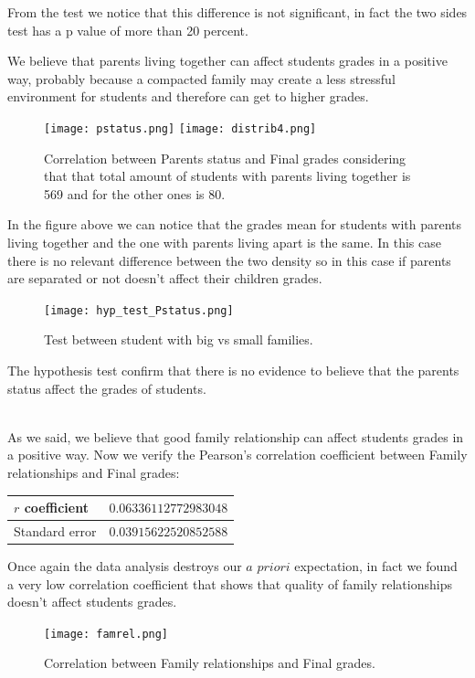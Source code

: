 \documentclass[a4paper, 11pt]{article}
\theoremstyle{definition}
\numberwithin{equation}{section}		%
\numberwithin{table}{section}				%
\begin{document}
\begin{itemize}
From the test we notice that this difference is not significant, in fact
the two sides test has a p value of more than 20 percent.

We believe that parents living together can affect students grades in a positive way, probably because a compacted family may create a less stressful environment for students and therefore can get to higher grades.
\begin{figure}[h]\centering
\texttt{[image: pstatus.png]}\quad
\texttt{[image: distrib4.png]}
\caption{Correlation between Parents status and Final grades considering that that total amount of students with parents living together is 569 and for the other ones is 80.}
\end{figure}

In the figure above we can notice that the grades mean for students with parents living together and the one with parents living apart is the same. In this case there is no relevant difference between the two density so in this case if parents are separated or not doesn't affect their children grades.

\begin{figure}[h]\centering
\texttt{[image: hyp\_test\_Pstatus.png]}
\caption{Test between student with big vs  small families.}
\end{figure}

The hypothesis test confirm that there is no evidence to believe that the 
parents status affect the grades of students.

\\As we said, we believe that good family relationship can affect students grades in a positive way.
Now we verify the Pearson's correlation coefficient between Family relationships and Final grades:
\begin{center}
\begin{tabular}{|p{3cm}|p{4cm}|}
\hline
$r$ coefficient & $0.06336112772983048$ \\
\hline
Standard error & $0.03915622520852588$ \\
\hline
\end{tabular}
\end{center}
Once again the data analysis destroys our $a$ $priori$ expectation, in fact we found a very low correlation coefficient that shows that quality of family relationships doesn't affect students grades.

\begin{figure}[h]\centering
\texttt{[image: famrel.png]}
\caption{Correlation between Family relationships and Final grades.}
\end{figure}


\end{itemize}
\end{document}
